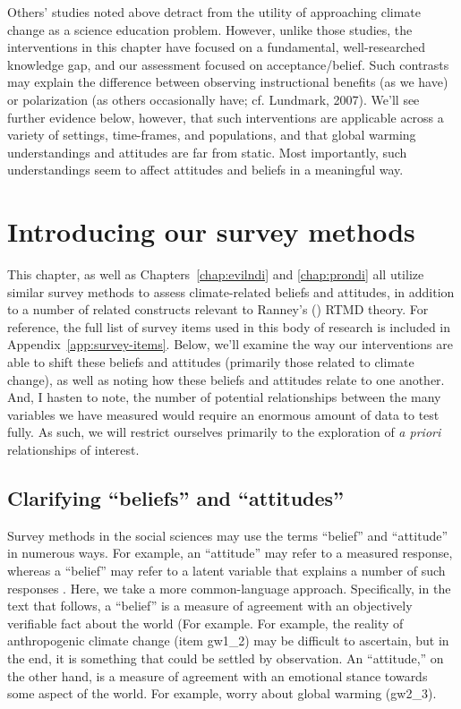 Others’ studies noted above detract from the utility of approaching climate
change as a science education problem. However, unlike those studies, the
interventions in this chapter have focused on a fundamental, well-researched
knowledge gap, and our assessment focused on acceptance/belief. Such contrasts
may explain the difference between observing instructional benefits (as we have)
or polarization (as others occasionally have; cf. Lundmark, 2007). We'll see
further evidence below, however, that such interventions are applicable across a
variety of settings, time-frames, and populations, and that global warming
understandings and attitudes are far from static. Most importantly, such
understandings seem to affect attitudes and beliefs in a meaningful way.

\section{Introducing our survey methods}
\label{sec:survey}

This chapter, as well as Chapters~\ref{chap:evilndi} and \ref{chap:prondi} all
utilize similar survey methods to assess climate-related beliefs and attitudes,
in addition to a number of related constructs relevant to Ranney's
(\citeyear{ranney_why_2012}) RTMD theory. For reference, the full list of survey
items used in this body of research is included in
Appendix~\ref{app:survey-items}. Below, we'll examine the way our interventions
are able to shift these beliefs and attitudes (primarily those related to
climate change), as well as noting how these beliefs and attitudes relate to one
another.  And, I hasten to note, the number of potential relationships between
the many variables we have measured would require an enormous amount of data to
test fully. As such, we will restrict ourselves primarily to the exploration of
\emph{a priori} relationships of interest.

\subsection{Clarifying \texorpdfstring{“beliefs”}{"beliefs"} and
    \texorpdfstring{“attitudes”}{"attitudes"}}

Survey methods in the social sciences may use the terms “belief” and “attitude”
in numerous ways. For example, an “attitude” may refer to a measured response,
whereas a “belief” may refer to a latent variable that explains a number of such
responses \cite{attitude-latent-var-ref}. Here, we take a more common-language
approach. Specifically, in the text that follows, a “belief” is a measure of
agreement with an objectively verifiable fact about the world (For example. For
example, the reality of anthropogenic climate change (item \textsf{gw1_2}) may
be difficult to ascertain, but in the end, it is something that could be settled
by observation. An “attitude,” on the other hand, is a measure of agreement with
an emotional stance towards some aspect of the world. For example, worry about
global warming (\textsf{gw2_3}).

